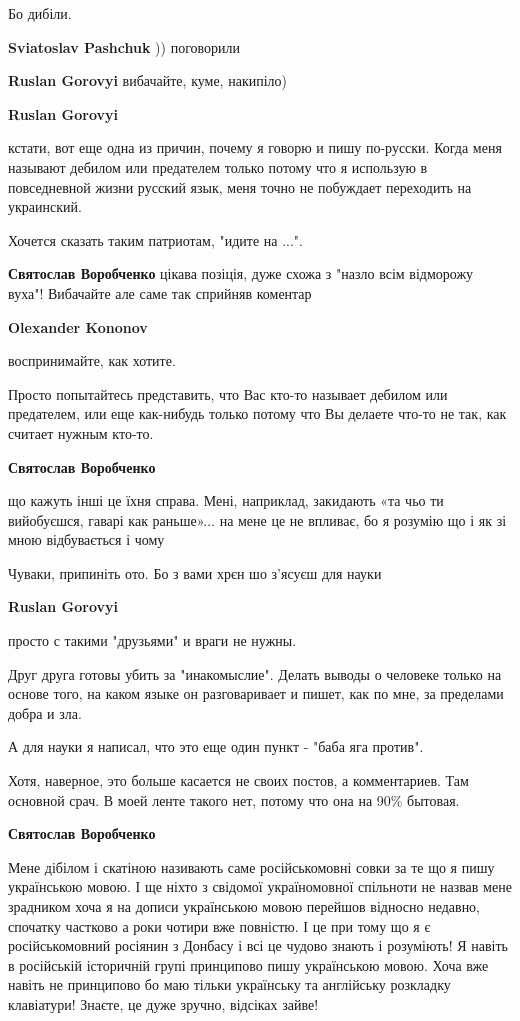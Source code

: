 \begin{itemize}
Бо дибіли.

\begin{itemize} %
\textbf{Sviatoslav Pashchuk} )) поговорили

\textbf{Ruslan Gorovyi} вибачайте, куме, накипіло)

\textbf{Ruslan Gorovyi} 

кстати, вот еще одна из причин, почему я говорю и пишу по-русски. Когда меня
называют дебилом или предателем только потому что я использую в повседневной
жизни русский язык, меня точно не побуждает переходить на украинский.

Хочется сказать таким патриотам, "идите на ...".


\textbf{Святослав Воробченко} цікава позіція, дуже схожа з "назло всім відморожу вуха"! Вибачайте але саме так сприйняв коментар

\textbf{Olexander Kononov} 

воспринимайте, как хотите.

Просто попытайтесь представить, что Вас кто-то называет дебилом или предателем,
или еще как-нибудь только потому что Вы делаете что-то не так, как считает
нужным кто-то.

\textbf{Святослав Воробченко} 

що кажуть інші це їхня справа. Мені, наприклад, закидають «та чьо ти
вийобуєшся, гаварі как раньше»... на мене це не впливає, бо я розумію що і як зі
мною відбувається і чому


Чуваки, припиніть ото. Бо з вами хрєн шо з’ясуєш для науки

\textbf{Ruslan Gorovyi} 

просто с такими "друзьями" и враги не нужны.

Друг друга готовы убить за "инакомыслие". Делать выводы о человеке только на
основе того, на каком языке он разговаривает и пишет, как по мне, за пределами
добра и зла.

А для науки я написал, что это еще один пункт - "баба яга против".

Хотя, наверное, это больше касается не своих постов, а комментариев. Там
основной срач. В моей ленте такого нет, потому что она на 90\% бытовая.

\textbf{Святослав Воробченко} 

Мене дібілом і скатіною називають саме російськомовні совки за те що я пишу
українською мовою. І ще ніхто з свідомої україномовної спільноти не назвав мене
зрадником хоча я на дописи українською мовою перейшов відносно недавно,
спочатку частково а роки чотири вже повністю. І це при тому що я є
російськомовний росіянин з Донбасу і всі це чудово знають і розуміють! Я навіть
в російській історичній групі принципово пишу українською мовою. Хоча вже
навіть не принципово бо маю тільки українську та англійську розкладку
клавіатури! Знаєте, це дуже зручно, відсіках зайве!



\end{itemize}
\end{itemize}
